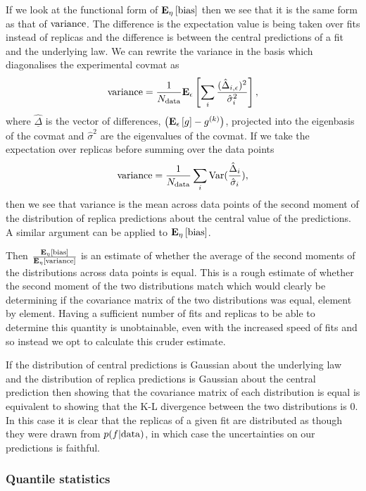 If we look at the functional form of $\mathbf{E}_{\eta}\left[ {\rm bias} \right]$ then we see that it is
the same form as that of ${\rm variance}$. The difference is the expectation value is
being taken over fits instead of replicas and the difference is between the
central predictions of a fit and the underlying law. We can rewrite the variance
in the basis which diagonalises the experimental covmat as
\begin{equation}
    {\rm variance} = \frac{1}{N_{\rm data}} \mathbf{E}_{\epsilon}\left[  \sum_{i} \frac{(\hat{\Delta}_{i, \epsilon})^2}{\hat{\sigma}_{i}^2} \right],
\end{equation}
where $\underline{\hat{\Delta}}$ is the vector of differences, $\left( \mathbf{E}_{\epsilon}\left[ g \right] - g^{(k)}\right)$,
projected into the eigenbasis of the covmat and $\hat{\sigma}^2$ are the
eigenvalues of the covmat. If we take the expectation over replicas before
summing over the data points
\begin{equation}
    {\rm variance} = \frac{1}{N_{\rm data}} \sum_{i} {\rm Var}(\frac{\hat{\Delta}_i}{\hat{\sigma}_i}),
\end{equation}
then we see that variance is the mean across data points of the second moment
of the distribution of replica predictions about the central value of the predictions.
A similar argument can be applied to $\mathbf{E}_{\eta}\left[ {\rm bias} \right]$.

Then $\frac{\mathbf{E}_{\eta}\left[ {\rm bias} \right]}{\mathbf{E}_{\eta}\left[ {\rm variance} \right]}$ is an estimate of whether the average
of the second moments of the distributions across data points is equal. This
is a rough estimate of whether the second moment of the two distributions match
which would clearly be determining if the covariance matrix of the two distributions
was equal, element by element. Having a sufficient number of fits and replicas
to be able to determine this quantity is unobtainable, even with the increased
speed of fits and so instead we opt to calculate this cruder estimate.

If the distribution of central predictions is Gaussian about the underlying law
and the distribution of replica predictions is Gaussian about the central prediction
then showing that the covariance matrix of each distribution is equal is equivalent
to showing that the K-L divergence between the two distributions is 0. In this
case it is clear that the replicas of a given fit are distributed as though
they were drawn from $p(f|{\rm data})$, in which case the uncertainties on
our predictions is faithful.

\subsubsection{Quantile statistics}


